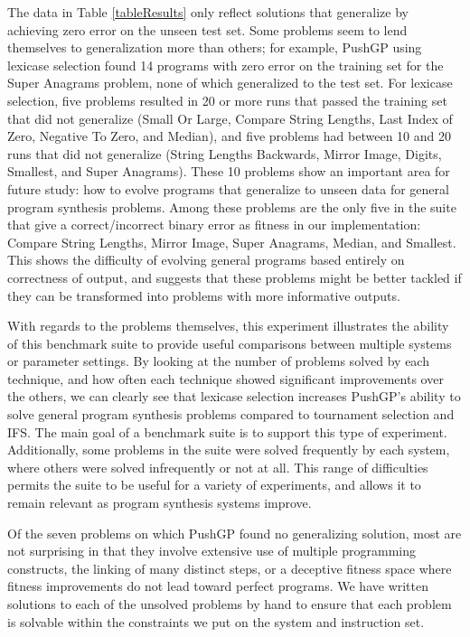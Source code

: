 \documentclass{sig-alternate}
\begin{document}
The data in Table \ref{tableResults} only reflect solutions that generalize by achieving zero error on the unseen test set. Some problems seem to lend themselves to generalization more than others; for example, PushGP using lexicase selection found 14 programs with zero error on the training set for the Super Anagrams problem, none of which generalized to the test set. For lexicase selection, five problems resulted in 20 or more runs that passed the training set that did not generalize (Small Or Large,
Compare String Lengths,
Last Index of Zero,
Negative To Zero, and
Median),
and five problems had between 10 and 20 runs that did not generalize (String Lengths Backwards,
Mirror Image,
Digits,
Smallest, and
Super Anagrams).
These 10 problems show an important area for future study: how to evolve programs that generalize to unseen data for general program synthesis problems. Among these problems are the only five in the suite that give a correct/incorrect binary error as fitness in our implementation: Compare String Lengths, Mirror Image, Super Anagrams, Median, and Smallest. This shows the difficulty of evolving general programs based entirely on correctness of output, and suggests that these problems might be better tackled if they can be transformed into problems with more informative outputs.

%

With regards to the problems themselves, this experiment illustrates the ability of this benchmark suite to provide useful comparisons between multiple systems or parameter settings. By looking at the number of problems solved by each technique, and how often each technique showed significant improvements over the others, we can clearly see that lexicase selection increases PushGP's ability to solve general program synthesis problems compared to tournament selection and IFS. The main goal of a benchmark suite is to support this type of experiment. Additionally, some problems in the suite were solved frequently by each system, where others were solved infrequently or not at all. This range of difficulties permits the suite to be useful for a variety of experiments, and allows it to remain relevant as program synthesis systems improve.

Of the seven problems on which PushGP found no generalizing solution, most are not surprising in that they involve extensive use of multiple programming constructs, the linking of many distinct steps, or a deceptive fitness space where fitness improvements do not lead toward perfect programs. 
We have written solutions to each of the unsolved problems by hand to ensure that each problem is solvable within the constraints we put on the system and instruction set.
\end{document}
